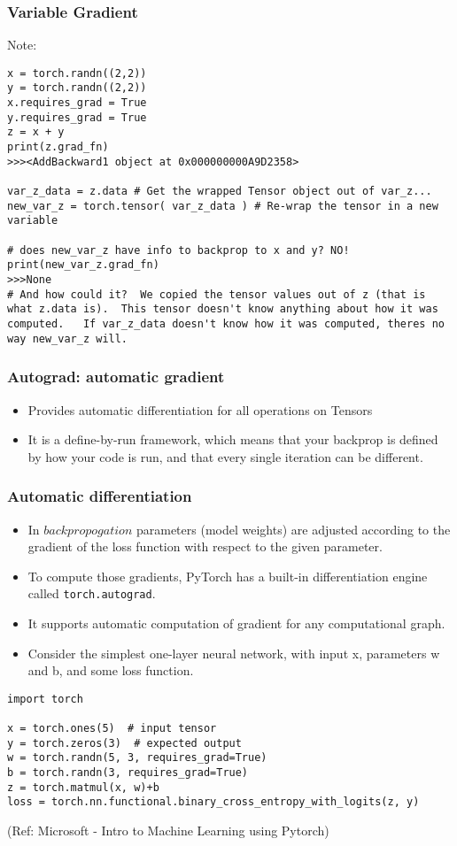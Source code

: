  
\begin{frame}[fragile]
\frametitle{Variable Gradient}
Note:
 \begin{lstlisting}
x = torch.randn((2,2))
y = torch.randn((2,2))
x.requires_grad = True
y.requires_grad = True
z = x + y 
print(z.grad_fn)
>>><AddBackward1 object at 0x000000000A9D2358>

var_z_data = z.data # Get the wrapped Tensor object out of var_z...
new_var_z = torch.tensor( var_z_data ) # Re-wrap the tensor in a new variable

# does new_var_z have info to backprop to x and y? NO!
print(new_var_z.grad_fn)
>>>None
# And how could it?  We copied the tensor values out of z (that is what z.data is).  This tensor doesn't know anything about how it was computed.   If var_z_data doesn't know how it was computed, theres no way new_var_z will.
\end{lstlisting}

\end{frame} 
 

\begin{frame}[fragile] \frametitle{Autograd: automatic gradient}
\begin{itemize}
\item Provides automatic differentiation for all operations on Tensors
\item It is a define-by-run framework, which means that your backprop is defined by how your code is run, and that every single iteration can be different.
\end{itemize}
\end{frame}

\begin{frame}[fragile] \frametitle{Automatic differentiation}

\begin{itemize}
\item In $backpropogation$ parameters (model weights) are adjusted according to the gradient of the loss function with respect to the given parameter.
\item To compute those gradients, PyTorch has a built-in differentiation engine called \lstinline|torch.autograd|. 
\item It supports automatic computation of gradient for any computational graph.
\item Consider the simplest one-layer neural network, with input x, parameters w and b, and some loss function.
\end{itemize}

\begin{lstlisting}
import torch

x = torch.ones(5)  # input tensor
y = torch.zeros(3)  # expected output
w = torch.randn(5, 3, requires_grad=True)
b = torch.randn(3, requires_grad=True)
z = torch.matmul(x, w)+b
loss = torch.nn.functional.binary_cross_entropy_with_logits(z, y)
\end{lstlisting}

\tiny{(Ref: Microsoft - Intro to Machine Learning using Pytorch)}
\end{frame}

